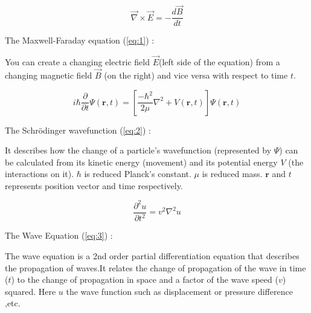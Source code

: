 

\begin{equation}
 \vec{\nabla}\times \vec{E} =  -\frac{d\vec{B}}{dt}
 \label{eq:1}
\end{equation}


    The Maxwell-Faraday equation (\ref{eq:1})   : 
    \begin{center}You can create a changing electric field $\vec{E}$(left side of the equation) from a changing magnetic field $\vec{B}$ (on the right) and vice versa with respect to time $t$.
\end{center}

\begin{equation}
 i\hbar\frac{\partial}{\partial t}\Psi(\textbf{r},t)=[{\frac{-\hbar^2}{2\mu}\nabla^2 +V(\textbf{r},t)}]\Psi(\textbf{r},t)\label{eq:2}
\end{equation}

The Schrödinger wavefunction (\ref{eq:2})   :  
\begin{center} It describes how the change of a particle’s wavefunction (represented by $\Psi$) can be calculated from its kinetic energy (movement) and its potential energy $V$ (the interactions on it). $\hbar$ is reduced Planck's constant. $\mu$ is reduced mass. $\textbf{r}$ and $t$ represents position vector and time respectively.
\end{center}



\begin{equation}
 \frac{\partial^2u}{\partial t^2}=v^2\nabla^2u 
 \label{eq:3}
\end{equation}


     The Wave Equation (\ref{eq:3})   : 
    \begin{center}The wave equation is a 2nd order partial differentiation equation that describes the propagation of waves.It relates the change of propagation of the wave in time ($t$) to the change of propagation in space and a factor of the wave speed ($v$) squared. Here $u$ the wave function such as displacement or pressure difference ,etc.
\end{center}
